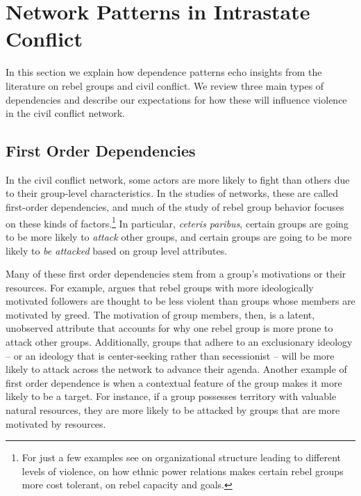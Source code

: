 \section*{Network Patterns in Intrastate Conflict}
In this section we explain how dependence patterns echo insights from the literature on rebel groups and civil conflict. We review three main types of dependencies and describe our expectations for how these will influence violence in the civil conflict network. 

\subsection*{First Order Dependencies}
\label{first:order}

In the civil conflict network, some actors are more likely to fight than others due to their group-level characteristics. In the studies of networks, these are called first-order dependencies, and much of the study of rebel group behavior focuses on these kinds of factors.\footnote{For just a few examples see \citet{weinstein:2007} on organizational structure leading to different levels of violence, \citet{wucherpfennig:etal:2012} on how ethnic power relations makes certain rebel groups more cost tolerant, \citet{buhaug:etal:2009} on rebel capacity and goals.} In particular, \emph{ceteris paribus}, certain groups are going to be more likely to \emph{attack} other groups, and certain groups are going to be more likely to \emph{be attacked} based on group level attributes.

Many of these first order dependencies stem from a group's motivations or their resources. For example, \cite{weinstein:2007} argues that rebel groups with more ideologically motivated followers are thought to be less violent than groups whose members are motivated by greed. The motivation of group members, then, is a latent, unobserved attribute that accounts for why one rebel group is more prone to attack other groups. Additionally, groups that adhere to an exclusionary ideology -- or an ideology that is center-seeking rather than secessionist -- will be more likely to attack across the network to advance their agenda. Another example of first order dependence is when a contextual feature of the group makes it more likely to be a target. For instance, if a group possesses territory with valuable natural resources, they are more likely to be attacked by groups that are more motivated by resources.

